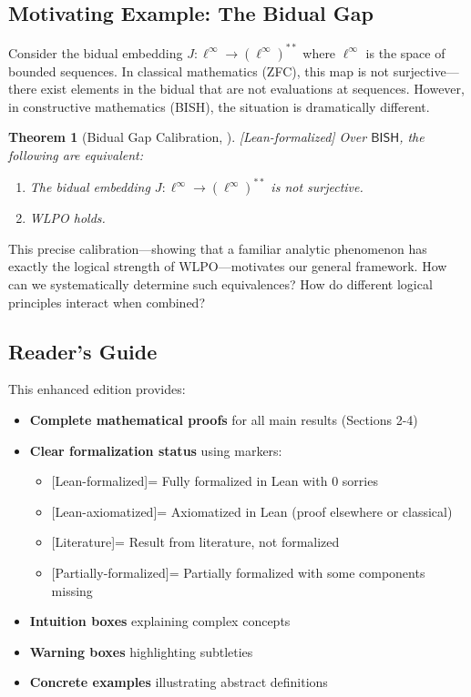 \documentclass[11pt]{article}
\theoremstyle{plain}
\newtheorem{theorem}{Theorem}[section]
\theoremstyle{definition}
\newcommand{\BISH}{\mathsf{BISH}}
\newcommand{\linf}{\ell^\infty}
\newcommand{\leanok}{\textsf{\textcolor{green!70!black}{[Lean-formalized]}}}
\newcommand{\leanaxiom}{\textsf{\textcolor{orange!80!black}{[Lean-axiomatized]}}}
\newcommand{\leancited}{\textsf{\textcolor{blue!70!black}{[Literature]}}}
\newcommand{\leanpartial}{\textsf{\textcolor{purple!70!black}{[Partially-formalized]}}}
\begin{document}
\subsection{Motivating Example: The Bidual Gap}

Consider the bidual embedding $J: \linf \to (\linf)^{**}$ where $\linf$ is the space of bounded sequences. In classical mathematics (ZFC), this map is not surjective—there exist elements in the bidual that are not evaluations at sequences. However, in constructive mathematics (BISH), the situation is dramatically different.

\begin{theorem}[Bidual Gap Calibration, \cite{Paper2}]\label{thm:paper2} \leanok
Over $\BISH$, the following are equivalent:
\begin{enumerate}
\item The bidual embedding $J: \linf \to (\linf)^{**}$ is not surjective.
\item WLPO holds.
\end{enumerate}
\end{theorem}

This precise calibration—showing that a familiar analytic phenomenon has exactly the logical strength of WLPO—motivates our general framework. How can we systematically determine such equivalences? How do different logical principles interact when combined?

\subsection{Reader's Guide}

This enhanced edition provides:
\begin{itemize}
\item \textbf{Complete mathematical proofs} for all main results (Sections 2-4)
\item \textbf{Clear formalization status} using markers:
  \begin{itemize}
  \item \leanok = Fully formalized in Lean with 0 sorries
  \item \leanaxiom = Axiomatized in Lean (proof elsewhere or classical)
  \item \leancited = Result from literature, not formalized
  \item \leanpartial = Partially formalized with some components missing
  \end{itemize}
\item \textbf{Intuition boxes} explaining complex concepts
\item \textbf{Warning boxes} highlighting subtleties
\item \textbf{Concrete examples} illustrating abstract definitions
\end{itemize}
\end{document}

